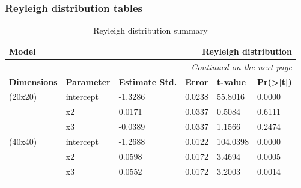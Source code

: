 \documentclass[12pt,a4paper,twoside]{article}
\begin{document}
\subsubsection{Reyleigh distribution tables}
\begin{longtable}{l|p{}|p{}|p{}|p{}|p{}}
    \textbf{Model}      & \multicolumn{5}{r}{Reyleigh distribution}                                                                                  \\
    \hline
    \endhead
    \hline
    \multicolumn{6}{r}{\emph{Continued on the next page}}                                                                                            \\
    \endfoot
    \hline
    \endlastfoot
    \hline
    \textbf{Dimensions} & \textbf{Parameter}                        & \textbf{Estimate Std.} & \textbf{Error} & \textbf{t-value} & \textbf{Pr(>|t|)} \\
    \hline
    (20x20)             & intercept                                 & -1.3286                & 0.0238         & 55.8016          & 0.0000            \\
                        & x2                                        & 0.0171                 & 0.0337         & 0.5084           & 0.6111            \\
                        & x3                                        & -0.0389                & 0.0337         & 1.1566           & 0.2474            \\
    \hline
    (40x40)             & intercept                                 & -1.2688                & 0.0122         & 104.0398         & 0.0000            \\
                        & x2                                        & 0.0598                 & 0.0172         & 3.4694           & 0.0005            \\
                        & x3                                        & 0.0552                 & 0.0172         & 3.2003           & 0.0014            \\
    \caption{Reyleigh distribution summary}
    \label{tab:reyleighsumtab}
\end{longtable}
\end{document}
